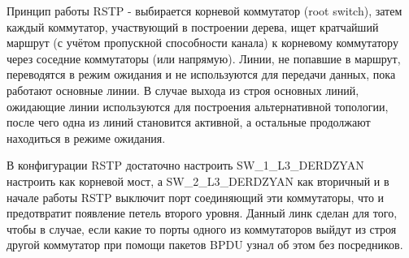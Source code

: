Принцип работы RSTP - выбирается корневой коммутатор (root switch), затем каждый коммутатор, участвующий в построении дерева, ищет кратчайший маршрут (с учётом пропускной способности канала) к корневому коммутатору через соседние коммутаторы (или напрямую). Линии, не попавшие в маршрут, переводятся в режим ожидания и не используются для передачи данных, пока работают основные линии. В случае выхода из строя основных линий, ожидающие линии используются для построения альтернативной топологии, после чего одна из линий становится активной, а остальные продолжают находиться в режиме ожидания.

В конфигурации RSTP достаточно настроить SW\_1\_L3\_DERDZYAN настроить как корневой мост, а SW\_2\_L3\_DERDZYAN как вторичный и в начале работы RSTP выключит порт соединяющий эти коммутаторы, что и предотвратит появление петель второго уровня. Данный линк сделан для того, чтобы в случае, если какие то порты одного из коммутаторов выйдут из строя другой коммутатор при помощи пакетов BPDU узнал об этом без посредников.


